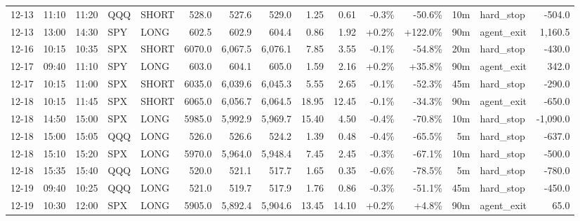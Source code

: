 \documentclass[11pt,a4paper,twoside]{article}
\begin{document}
\begin{landscape}
\begin{center}
\begin{longtable}{>{\color{txtmain}}l l l l l r r r r r r r r >{\color{txtmain}}l r}
12-13 & 11:10 & 11:20 & QQQ & SHORT & 528.0 & 527.6 & 529.0 & 1.25 & 0.61 & \textcolor{lossred}{-0.3\%} & \textcolor{lossred}{-50.6\%} & 10m & hard\_stop & \textcolor{lossred}{-504.0} \\
12-13 & 13:00 & 14:30 & SPY & LONG & 602.5 & 602.9 & 604.4 & 0.86 & 1.92 & \textcolor{wingreen}{+0.2\%} & \textcolor{wingreen}{+122.0\%} & 90m & agent\_exit & \textcolor{wingreen}{1,160.5} \\
12-16 & 10:15 & 10:35 & SPX & SHORT & 6070.0 & 6,067.5 & 6,076.1 & 7.85 & 3.55 & \textcolor{lossred}{-0.1\%} & \textcolor{lossred}{-54.8\%} & 20m & hard\_stop & \textcolor{lossred}{-430.0} \\
12-17 & 09:40 & 11:10 & SPY & LONG & 603.0 & 604.1 & 605.0 & 1.59 & 2.16 & \textcolor{wingreen}{+0.2\%} & \textcolor{wingreen}{+35.8\%} & 90m & agent\_exit & \textcolor{wingreen}{342.0} \\
12-17 & 10:15 & 11:00 & SPX & SHORT & 6035.0 & 6,039.6 & 6,045.3 & 5.55 & 2.65 & \textcolor{lossred}{-0.1\%} & \textcolor{lossred}{-52.3\%} & 45m & hard\_stop & \textcolor{lossred}{-290.0} \\
12-18 & 10:15 & 11:45 & SPX & SHORT & 6065.0 & 6,056.7 & 6,064.5 & 18.95 & 12.45 & \textcolor{lossred}{-0.1\%} & \textcolor{lossred}{-34.3\%} & 90m & agent\_exit & \textcolor{lossred}{-650.0} \\
12-18 & 14:50 & 15:00 & SPX & LONG & 5985.0 & 5,992.9 & 5,969.7 & 15.40 & 4.50 & \textcolor{lossred}{-0.4\%} & \textcolor{lossred}{-70.8\%} & 10m & hard\_stop & \textcolor{lossred}{-1,090.0} \\
12-18 & 15:00 & 15:05 & QQQ & LONG & 526.0 & 526.6 & 524.2 & 1.39 & 0.48 & \textcolor{lossred}{-0.4\%} & \textcolor{lossred}{-65.5\%} & 5m & hard\_stop & \textcolor{lossred}{-637.0} \\
12-18 & 15:10 & 15:20 & SPX & LONG & 5970.0 & 5,964.0 & 5,948.4 & 7.45 & 2.45 & \textcolor{lossred}{-0.3\%} & \textcolor{lossred}{-67.1\%} & 10m & hard\_stop & \textcolor{lossred}{-500.0} \\
12-18 & 15:35 & 15:40 & QQQ & LONG & 520.0 & 521.1 & 517.7 & 1.65 & 0.35 & \textcolor{lossred}{-0.6\%} & \textcolor{lossred}{-78.5\%} & 5m & hard\_stop & \textcolor{lossred}{-780.0} \\
12-19 & 09:40 & 10:25 & QQQ & LONG & 521.0 & 519.7 & 517.9 & 1.76 & 0.86 & \textcolor{lossred}{-0.3\%} & \textcolor{lossred}{-51.1\%} & 45m & hard\_stop & \textcolor{lossred}{-450.0} \\
12-19 & 10:30 & 12:00 & SPX & LONG & 5905.0 & 5,892.4 & 5,904.6 & 13.45 & 14.10 & \textcolor{wingreen}{+0.2\%} & \textcolor{wingreen}{+4.8\%} & 90m & agent\_exit & \textcolor{wingreen}{65.0} \\

\end{longtable}
\end{center}
\end{landscape}
\end{document}
